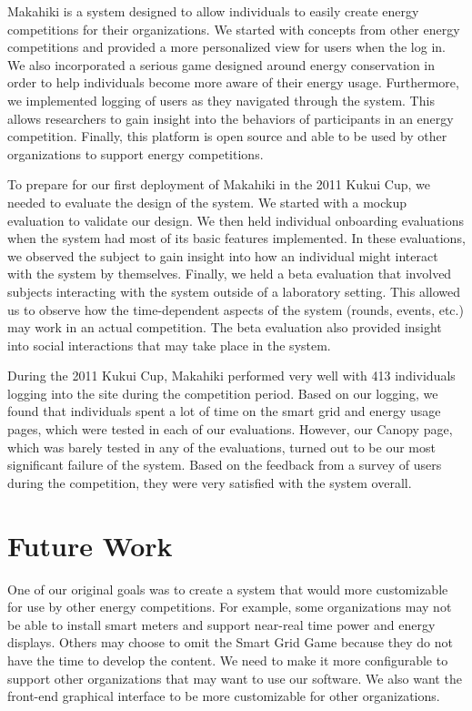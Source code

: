 Makahiki is a system designed to allow individuals to easily create energy competitions for their organizations. We started with concepts from other energy competitions and provided a more personalized view for users when the log in. We also incorporated a serious game designed around energy conservation in order to help individuals become more aware of their energy usage. Furthermore, we implemented logging of users as they navigated through the system. This allows researchers to gain insight into the behaviors of participants in an energy competition. Finally, this platform is open source and able to be used by other organizations to support energy competitions.

To prepare for our first deployment of Makahiki in the 2011 Kukui Cup, we needed to evaluate the design of the system. We started with a mockup evaluation to validate our design. We then held individual onboarding evaluations when the system had most of its basic features implemented. In these evaluations, we observed the subject to gain insight into how an individual might interact with the system by themselves. Finally, we held a beta evaluation that involved subjects interacting with the system outside of a laboratory setting. This allowed us to observe how the time-dependent aspects of the system (rounds, events, etc.) may work in an actual competition. The beta evaluation also provided insight into social interactions that may take place in the system.

During the 2011 Kukui Cup, Makahiki performed very well with 413 individuals logging into the site during the competition period. Based on our logging, we found that individuals spent a lot of time on the smart grid and energy usage pages, which were tested in each of our evaluations. However, our Canopy page, which was barely tested in any of the evaluations, turned out to be our most significant failure of the system. Based on the feedback from a survey of users during the competition, they were very satisfied with the system overall.

\section{Future Work}
\label{future-work}

One of our original goals was to create a system that would more customizable for use by other energy competitions. For example, some organizations may not be able to install smart meters and support near-real time power and energy displays. Others may choose to omit the Smart Grid Game because they do not have the time to develop the content. We need to make it more configurable to support other organizations that may want to use our software. We also want the front-end graphical interface to be more customizable for other organizations.

